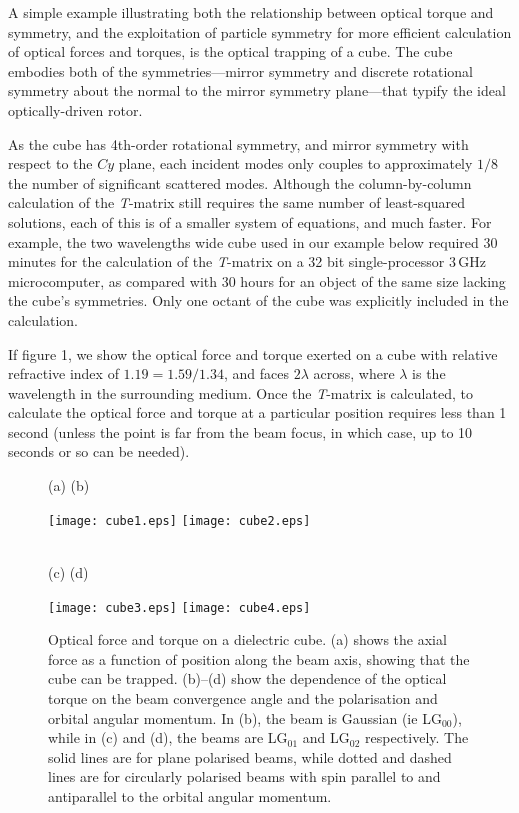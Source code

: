 \documentclass{article}
\begin{document}
A simple example illustrating both the relationship between optical
torque and symmetry, and the exploitation of particle symmetry for
more efficient calculation of optical forces and torques,
is the optical trapping of a cube. The cube embodies both
of the symmetries---mirror symmetry and discrete rotational
symmetry about the normal to the mirror symmetry plane---that
typify the ideal optically-driven rotor.

As the cube has 4th-order rotational symmetry, and mirror symmetry
with respect to the $Cy$ plane, each incident modes only couples to
approximately $1/8$ the number of significant scattered modes.
Although the column-by-column calculation of the \textit{T}-matrix
still requires the same number of least-squared solutions, each of
this is of a smaller system of equations, and much faster.
For example, the two wavelengths wide cube used in our example below
required 30 minutes for the calculation of the \textit{T}-matrix
on a 32 bit single-processor 3\,GHz microcomputer, as compared with
30 hours for an object of the same size lacking the cube's symmetries.
Only one octant of the cube was explicitly included in the
calculation.

If figure 1, we show the optical force and torque exerted on a
cube with relative refractive index of $1.19 = 1.59/1.34$, and faces
$2\lambda$ across, where $\lambda$ is the wavelength in the surrounding
medium. Once the \textit{T}-matrix is calculated, to calculate the
optical force and torque at a particular position requires less than
1 second (unless the point is far from the beam focus, in which case,
up to 10 seconds or so can be needed).

\begin{figure}[!h]
(a) \hspace{0.47\columnwidth} (b) \\
\centerline{\texttt{[image: cube1.eps]}
\texttt{[image: cube2.eps]}} \\
(c)  \hspace{0.47\columnwidth} (d) \\
\centerline{\texttt{[image: cube3.eps]}
\texttt{[image: cube4.eps]}} 
\caption{Optical force and torque on a dielectric cube. (a) shows the
axial force as a function of position along the beam axis, showing that
the cube can be trapped. (b)--(d) show the dependence of the optical
torque on the beam convergence angle and the polarisation and orbital
angular momentum. In (b), the beam is Gaussian (ie LG$_{00}$), while in
(c) and (d), the beams are LG$_{01}$ and LG$_{02}$ respectively.
The solid lines are for plane polarised beams, while dotted and dashed
lines are for circularly polarised beams with spin parallel to and
antiparallel to the orbital angular momentum.}
\label{fig1}
\end{figure}
\end{document}

